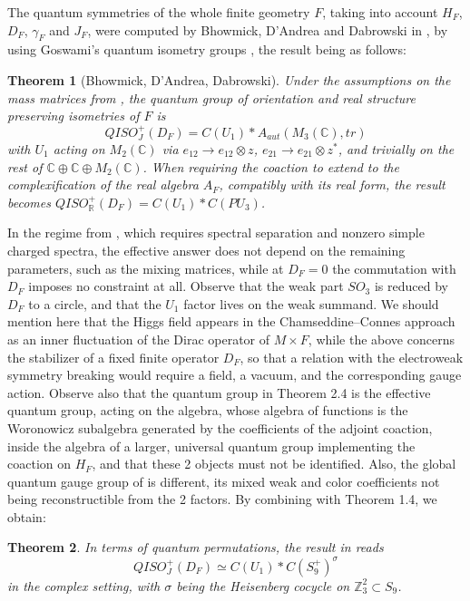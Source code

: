 \documentclass[11pt]{amsart}
\newtheorem{theorem}{Theorem}[section]
\theoremstyle{definition}
\begin{document}
The quantum symmetries of the whole finite geometry $F$, taking into account $H_F$, $D_F$, $\gamma_F$ and $J_F$, were computed by Bhowmick, D'Andrea and Dabrowski in \cite{bdd}, by using Goswami's quantum isometry groups \cite{bgo,gos}, the result being as follows:

\begin{theorem}[Bhowmick, D'Andrea, Dabrowski]
Under the assumptions on the mass matrices from \cite[section 3.1]{bdd}, the quantum group of orientation and real structure preserving isometries of $F$ is
$$QISO^+_J(D_F)=C(U_1)*A_{aut}(M_3(\mathbb C),tr)$$
with $U_1$ acting on $M_2(\mathbb C)$ via $e_{12}\to e_{12}\otimes z$, $e_{21}\to e_{21}\otimes z^*$, and trivially on the rest of $\mathbb C\oplus\mathbb C\oplus M_2(\mathbb C)$. When requiring the coaction to extend to the complexification of the real algebra $A_F$, compatibly with its real form, the result becomes $QISO^+_{\mathbb R}(D_F)=C(U_1)*C(PU_3)$.
\end{theorem}

In the regime from \cite[section 3.1]{bdd}, which requires spectral separation and nonzero simple charged spectra, the effective answer does not depend on the remaining parameters, such as the mixing matrices, while at $D_F=0$ the commutation with $D_F$ imposes no constraint at all. Observe that the weak part $SO_3$ is reduced by $D_F$ to a circle, and that the $U_1$ factor lives on the weak summand. We should mention here that the Higgs field appears in the Chamseddine--Connes approach as an inner fluctuation of the Dirac operator of $M\times F$, while the above concerns the stabilizer of a fixed finite operator $D_F$, so that a relation with the electroweak symmetry breaking would require a field, a vacuum, and the corresponding gauge action. Observe also that the quantum group in Theorem 2.4 is the effective quantum group, acting on the algebra, whose algebra of functions is the Woronowicz subalgebra generated by the coefficients of the adjoint coaction, inside the algebra of a larger, universal quantum group implementing the coaction on $H_F$, and that these 2 objects must not be identified. Also, the global quantum gauge group of \cite{bddd} is different, its mixed weak and color coefficients not being reconstructible from the 2 factors. By combining with Theorem 1.4, we obtain:

\begin{theorem}
In terms of quantum permutations, the result in \cite{bdd} reads
$$QISO^+_J(D_F)\simeq C(U_1)*C(S_9^+)^\sigma$$
in the complex setting, with $\sigma$ being the Heisenberg cocycle on $\mathbb Z_3^2\subset S_9$.
\end{theorem}
\end{document}
